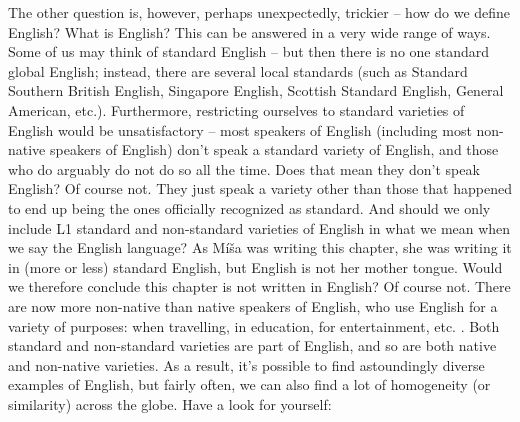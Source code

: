 The other question is, however, perhaps unexpectedly, trickier -- how do we define English? What is English? This can be answered in a very wide range of ways. Some of us may think of standard English -- but then there is no one standard global English; instead, there are several local standards (such as Standard Southern British English, Singapore English, Scottish Standard English, General American, etc.). Furthermore, restricting ourselves to standard varieties of English would be unsatisfactory -- most speakers of English (including most non-native speakers of English) don't speak a standard variety of English, and those who do arguably do not do so all the time. Does that mean they don't speak English? Of course not. They just speak a variety other than those that happened to end up being the ones officially recognized as standard. And should we only include L1 standard and non-standard varieties of English in what we mean when we say the English language? As Míša was writing this chapter, she was writing it in (more or less) standard English, but English is not her mother tongue. Would we therefore conclude this chapter is not written in English? Of course not. There are now more non-native than native speakers of English, who use English for a variety of purposes: when travelling, in education, for entertainment, etc. \citep[68]{Crystal2003b}. Both standard and non-standard varieties are part of English, and so are both native and non-native varieties. As a result, it's possible to find astoundingly diverse examples of English, but fairly often, we can also find a lot of homogeneity (or similarity) across the globe. Have a look for yourself:

